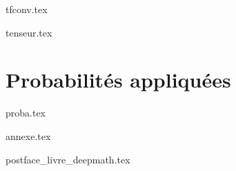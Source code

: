 \documentclass[11pt]{report}
\begin{document}
{tfconv.tex}

{tenseur.tex}



\part{Probabilités appliquées}

{proba.tex}


\clearemptydoublepage


{annexe.tex}

{postface_livre_deepmath.tex}

\vfill
\bigskip
\bigskip

\end{document}
